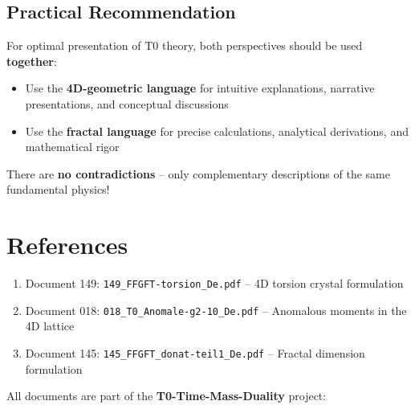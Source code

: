 	\subsection{Practical Recommendation}
	
	\begin{important}
		For optimal presentation of T0 theory, both perspectives should be used \textbf{together}:
		
		\begin{itemize}
			\item Use the \textbf{4D-geometric language} for intuitive explanations, narrative presentations, and conceptual discussions
			\item Use the \textbf{fractal language} for precise calculations, analytical derivations, and mathematical rigor
		\end{itemize}
		
		There are \textbf{no contradictions} -- only complementary descriptions of the same fundamental physics!
	\end{important}
	
	\section*{References}
	
	\begin{enumerate}
		\item Document 149: \texttt{149\_FFGFT-torsion\_De.pdf} -- 4D torsion crystal formulation
		\item Document 018: \texttt{018\_T0\_Anomale-g2-10\_De.pdf} -- Anomalous moments in the 4D lattice
		\item Document 145: \texttt{145\_FFGFT\_donat-teil1\_De.pdf} -- Fractal dimension formulation
	\end{enumerate}
	
	All documents are part of the \textbf{T0-Time-Mass-Duality} project:\\

